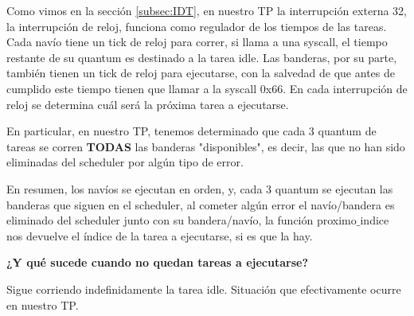 \par{Como vimos en la sección \ref{subsec:IDT}, en nuestro TP la interrupción externa 32, la interrupción de reloj, funciona como regulador de los tiempos de las tareas. Cada navío tiene un tick de reloj para correr, si llama a una syscall, el tiempo restante de su quantum es destinado a la tarea idle. Las banderas, por su parte, también tienen un tick de reloj para ejecutarse, con la salvedad de que antes de cumplido este tiempo tienen que llamar a la syscall 0x66. En cada interrupción de reloj se determina cuál será la próxima tarea a ejecutarse.}
\par{En particular, en nuestro TP, tenemos determinado que cada 3 quantum de tareas se corren \textbf{TODAS} las banderas "disponibles", es decir, las que no han sido eliminadas del scheduler por algún tipo de error.}
\par{En resumen, los navíos se ejecutan en orden, y, cada 3 quantum se ejecutan las banderas que siguen en el scheduler, al cometer algún error el navío/bandera es eliminado del scheduler junto con su bandera/navío, la función proximo$\_$indice nos devuelve el índice de la tarea a ejecutarse, si es que la hay.} 
\medskip
\par{\textbf{¿Y qué sucede cuando no quedan tareas a ejecutarse?}}
\par{Sigue corriendo indefinidamente la tarea idle. Situación que efectivamente ocurre en nuestro TP.}